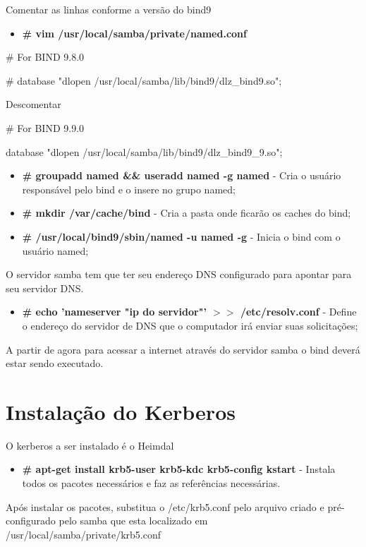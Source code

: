 Comentar as linhas conforme a versão do bind9 

\begin{itemize}
	\item \textbf{\# vim /usr/local/samba/private/named.conf}
\end{itemize}

\# For BIND 9.8.0

    \# database "dlopen /usr/local/samba/lib/bind9/dlz\_bind9.so"; 

Descomentar

 \# For BIND 9.9.0

    database "dlopen /usr/local/samba/lib/bind9/dlz\_bind9\_9.so";

\begin{itemize}
	\item \textbf{\# groupadd named \&\& useradd named -g named} - Cria o usuário responsável pelo bind e o insere no grupo named;
	\item \textbf{\# mkdir /var/cache/bind} - Cria a pasta onde ficarão os caches do bind;
	\item \textbf{\# /usr/local/bind9/sbin/named -u named -g} - Inicia o bind com o usuário named;
\end{itemize}

O servidor samba tem que ter seu endereço DNS configurado para apontar para seu servidor DNS.

\begin{itemize}
	\item \textbf{\# echo 'nameserver "ip do servidor"' $>$$>$ /etc/resolv.conf} - Define o endereço do servidor de DNS que o computador irá enviar suas solicitações;
\end{itemize}

A partir de agora para acessar a internet através do servidor samba o bind deverá estar sendo executado.

\section{Instalação do Kerberos}

O kerberos a ser instalado é o Heimdal

\begin{itemize}
	\item \textbf{\# apt-get install krb5-user krb5-kdc krb5-config kstart} - Instala todos os pacotes necessários e faz as referências necessárias.
\end{itemize}

Após instalar os pacotes, substitua o /etc/krb5.conf pelo arquivo criado e pré-configurado pelo samba que esta localizado em /usr/local/samba/private/krb5.conf

